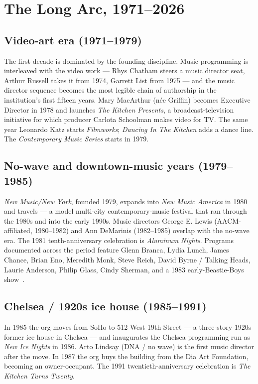 \documentclass[10pt,letterpaper,twocolumn]{article}
\begin{document}
\section{The Long Arc, 1971--2026}

\subsection{Video-art era (1971--1979)}

The first decade is dominated by the founding discipline. Music programming is interleaved with the video work --- Rhys Chatham steers a music director seat, Arthur Russell takes it from 1974, Garrett List from 1975 --- and the music director sequence becomes the most legible chain of authorship in the institution's first fifteen years. Mary MacArthur (n\'ee Griffin) becomes Executive Director in 1978 and launches \emph{The Kitchen Presents}, a broadcast-television initiative for which producer Carlota Schoolman makes video for TV. The same year Leonardo Katz starts \emph{Filmworks}; \emph{Dancing In The Kitchen} adds a dance line. The \emph{Contemporary Music Series} starts in 1979.

\subsection{No-wave and downtown-music years (1979--1985)}

\emph{New Music/New York}, founded 1979, expands into \emph{New Music America} in 1980 and travels --- a model multi-city contemporary-music festival that ran through the 1980s and into the early 1990s. Music directors George E. Lewis (AACM-affiliated, 1980--1982) and Ann DeMarinis (1982--1985) overlap with the no-wave era. The 1981 tenth-anniversary celebration is \emph{Aluminum Nights}. Programs documented across the period feature Glenn Branca, Lydia Lunch, James Chance, Brian Eno, Meredith Monk, Steve Reich, David Byrne / Talking Heads, Laurie Anderson, Philip Glass, Cindy Sherman, and a 1983 early-Beastie-Boys show~\citep{wikipedia_kitchen}.

\subsection{Chelsea / 1920s ice house (1985--1991)}

In 1985 the org moves from SoHo to 512 West 19th Street --- a three-story 1920s former ice house in Chelsea --- and inaugurates the Chelsea programming run as \emph{New Ice Nights} in 1986. Arto Lindsay (DNA / no wave) is the first music director after the move. In 1987 the org buys the building from the Dia Art Foundation, becoming an owner-occupant. The 1991 twentieth-anniversary celebration is \emph{The Kitchen Turns Twenty}.
\end{document}
